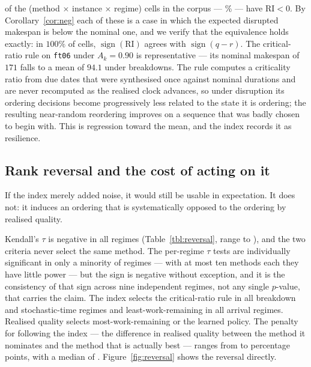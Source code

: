\documentclass[a4paper,fleqn]{cas-sc}
\newcommand{\RI}{\mathrm{RI}}
\begin{document}
\NRINeg{} of the \PropCells{} (method $\times$ instance $\times$ regime) cells in
the corpus --- \PctRINeg{}\% --- have $\RI<0$. By Corollary~\ref{cor:neg} each of these is a case in which the
expected disrupted makespan is below the nominal one, and we verify that the
equivalence holds exactly: in $100\%$ of cells, $\operatorname{sign}(\RI)$ agrees
with $\operatorname{sign}(q-r)$. The critical-ratio rule on \texttt{ft06} under
$A_k=0.90$ is representative --- its nominal makespan of $171$ falls to a mean of
$94.1$ under breakdowns. The rule computes a criticality ratio from due dates
that were synthesised once against nominal durations and are never recomputed as
the realised clock advances, so under disruption its ordering decisions become
progressively less related to the state it is ordering; the resulting near-random
reordering improves on a sequence that was badly chosen to begin with. This is
regression toward the mean, and the index records it as resilience.

\subsection{Rank reversal and the cost of acting on it}\label{sec:res-reversal}

If the index merely added noise, it would still be usable in expectation. It
does not: it induces an ordering that is systematically opposed to the ordering
by realised quality.



Kendall's $\tau$ is negative in all \NRegimes{} regimes (Table~\ref{tbl:reversal},
range \TauMin{} to \TauMax{}), and the two criteria never select the same
method. The per-regime $\tau$ tests are individually significant in only a
minority of regimes --- with at most ten methods each they have little power ---
but the sign is negative without exception, and it is the consistency of that
sign across nine independent regimes, not any single $p$-value, that carries the
claim. The index selects the critical-ratio rule in all \CRWins{} breakdown and
stochastic-time regimes and least-work-remaining in all \LWKRWins{} arrival
regimes. Realised quality selects most-work-remaining or the learned policy. The
penalty for following the index --- the difference in realised quality between
the method it nominates and the method that is actually best --- ranges from
\PenaltyMin{} to \PenaltyMax{} percentage points, with a median of
\PenaltyMedian{}. Figure~\ref{fig:reversal} shows the reversal directly.
\end{document}
